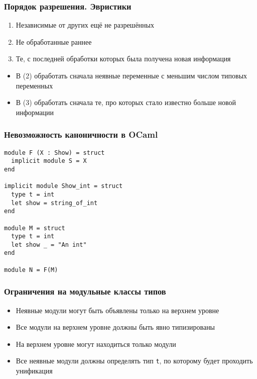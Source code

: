 \documentclass{beamer}
\newcommand{\backupend}{
   \addtocounter{framenumberappendix}{-\value{framenumber}}
   \addtocounter{framenumber}{\value{framenumberappendix}} 
}
\begin{document}
\lstset{language=caml}
\begin{frame}[fragile]\frametitle{Порядок разрешения. Эвристики}
\begin{enumerate}
    \item Независимые от других ещё не разрешённых
    \item Не обработанные раннее
    \item Те, с последней обработки которых была получена новая информация
  \end{enumerate}
\begin{itemize}
  \item В (2) обработать сначала неявные переменные с меньшим числом типовых переменных
  \item В (3) обработать сначала те, про которых стало известно больше новой информации
\end{itemize}
\end{frame}

\lstset{language=caml}
\begin{frame}[fragile]\frametitle{Невозможность каноничности в OCaml}
\begin{lstlisting}
module F (X : Show) = struct
  implicit module S = X
end

implicit module Show_int = struct
  type t = int
  let show = string_of_int
end

module M = struct
  type t = int
  let show _ = "An int"
end

module N = F(M)
\end{lstlisting}
\end{frame}


\begin{frame}\frametitle{Ограничения на модульные классы типов}
\begin{itemize}
  \item Неявные модули могут быть объявлены только на верхнем уровне
  \item Все модули на верхнем уровне должны быть явно типизированы
  \item На верхнем уровне могут находиться только модули
  \item Все неявные модули должны определять тип \texttt{t}, по которому будет проходить унификация 
\end{itemize}
\end{frame}


\backupend
\end{document}
